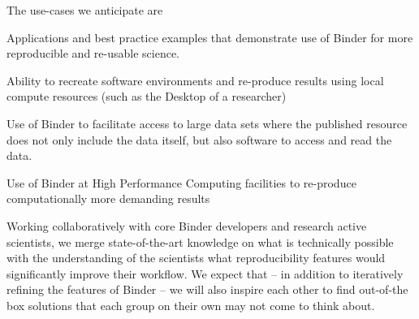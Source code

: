\begin{workpackage}[
  id=applications,
  wphases=0-36!1.11,
  swsites,
  title=Applications and use cases,
  short=Applications,
  lead=MP,
  MPRM=15,
  SRLRM=3,
  UIORM=8,
  IFRRM=14
]
\begin{wpdescription}
  The use-cases we anticipate are
  \begin{compactitem}
  \item {} Applications and best practice examples that
    demonstrate use of Binder for more reproducible and re-usable science.
  \item {} Ability to recreate software environments
    and re-produce results using local compute resources (such as the Desktop of
    a researcher)
  \item {} Use of Binder to facilitate access to
    large data sets where the published resource does not only include the data
    itself, but also software to access and read the data.
  \item {} Use of Binder at High Performance Computing
    facilities to re-produce computationally more demanding results
  \end{compactitem}


  Working collaboratively with core Binder developers and research active
  scientists, we merge state-of-the-art knowledge on what is technically
  possible with the understanding of the scientists what reproducibility
  features would significantly improve their workflow. We expect that -- in
  addition to iteratively refining the features of Binder -- we will also
  inspire each other to find out-of-the box solutions that each group on
  their own may not come to think about.

  \medskip



\end{wpdescription}
\end{workpackage}
